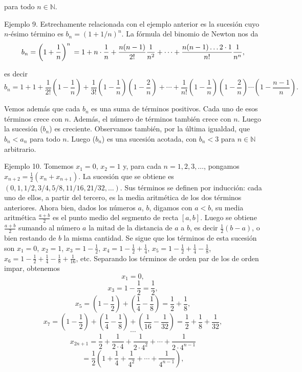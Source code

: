 \documentclass[12pt,oneside]{book}
\begin{document}
para todo \(n \in \mathbb{N}\).

Ejemplo 9. Estrechamente relacionada con el ejemplo anterior es la sucesión cuyo \(n\)-ésimo término es \(b_n = (1 + 1/n)^n\). La fórmula del binomio de Newton nos da
\[
b_n = \left(1 + \frac{1}{n}\right)^n \\
= 1 + n \cdot \frac{1}{n} + \frac{n(n-1)}{2!} \frac{1}{n^2} + \cdots + \frac{n(n-1)\ldots 2\cdot 1}{n!} \frac{1}{n^n},
\]

es decir
\[
b_n = 1 + 1 + \frac{1}{2!} \left(1 - \frac{1}{n}\right) + \frac{1}{3!} \left(1 - \frac{1}{n}\right) \left(1 - \frac{2}{n}\right) + \cdots
+ \frac{1}{n!} \left(1 - \frac{1}{n}\right) \left(1 - \frac{2}{n}\right) \cdots \left(1 - \frac{n-1}{n}\right).
\]

Vemos además que cada \( b_n \) es una suma de términos positivos. Cada uno de esos términos crece con \( n \). Además, el número de términos también crece con \( n \). Luego la sucesión (\( b_n \)) es creciente. Observamos también, por la última igualdad, que \( b_n < a_n \) para todo \( n \). Luego (\( b_n \)) es una sucesión acotada, con \( b_n < 3 \) para \( n \in \mathbb{N} \) arbitrario.

Ejemplo 10. Tomemos \( x_1 = 0 \), \( x_2 = 1 \) y, para cada \( n = 1, 2, 3, \dots \), pongamos \( x_{n+2} = \frac{1}{2}(x_n + x_{n+1}) \). La sucesión que se obtiene es \( (0, 1, 1/2, 3/4, 5/8, 11/16, 21/32, \dots ) \). Sus términos se definen por inducción: cada uno de ellos, a partir del tercero, es la media aritmética de los dos términos anteriores. Ahora bien, dados los números \( a \), \( b \), digamos con \( a < b \), su media aritmética \( \frac{a+b}{2} \) es el punto medio del segmento de recta \([a, b]\). Luego se obtiene \( \frac{a+b}{2} \) sumando al número \( a \) la mitad de la distancia de \( a \) a \( b \), es decir \( \frac{1}{2}(b-a) \), o bien restando de \( b \) la misma cantidad. Se sigue que los términos de esta sucesión son \( x_1 = 0 \), \( x_2 = 1 \), \( x_3 = 1 - \frac{1}{2} \), \( x_4 = 1 - \frac{1}{2} + \frac{1}{4} \), \( x_5 = 1 - \frac{1}{2} + \frac{1}{4} - \frac{1}{8} \), \( x_6 = 1 - \frac{1}{2} + \frac{1}{4} - \frac{1}{8} + \frac{1}{16} \), etc. Separando los términos de orden par de los de orden impar, obtenemos
\[x_1 = 0,\]
\[x_3 = 1 - \frac{1}{2} = \frac{1}{2},\]
\[x_5 = \left(1 - \frac{1}{2}\right) + \left(\frac{1}{4} - \frac{1}{8}\right) = \frac{1}{2} + \frac{1}{8},\]
\[x_7 = \left(1 - \frac{1}{2}\right) + \left(\frac{1}{4} - \frac{1}{8}\right) + \left(\frac{1}{16} - \frac{1}{32}\right) = \frac{1}{2} + \frac{1}{8} + \frac{1}{32},\]
\[\cdots\]
\[x_{2n+1} = \frac{1}{2} + \frac{1}{2 \cdot 4} + \frac{1}{2 \cdot 4^2} + \cdots + \frac{1}{2 \cdot 4^{n-1}}\]
\[= \frac{1}{2} \left(1 + \frac{1}{4} + \frac{1}{4^2} + \cdots + \frac{1}{4^{n-1}}\right),\]
\end{document}
